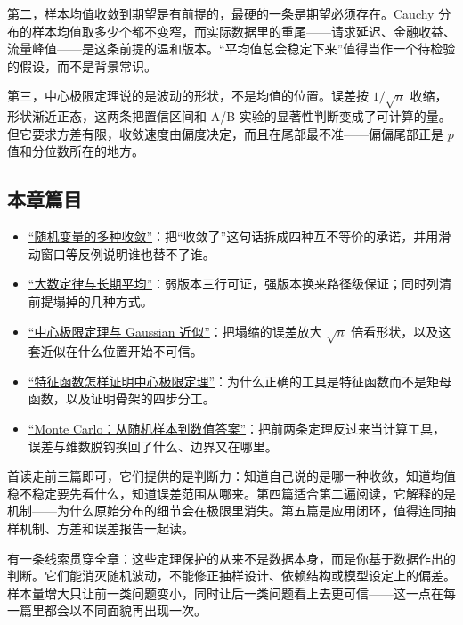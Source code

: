 第二，样本均值收敛到期望是有前提的，最硬的一条是期望必须存在。Cauchy 分布的样本均值取多少个都不变窄，而实际数据里的重尾——请求延迟、金融收益、流量峰值——是这条前提的温和版本。``平均值总会稳定下来''值得当作一个待检验的假设，而不是背景常识。

第三，中心极限定理说的是波动的形状，不是均值的位置。误差按 \(1/\sqrt n\) 收缩，形状渐近正态，这两条把置信区间和 A/B 实验的显著性判断变成了可计算的量。但它要求方差有限，收敛速度由偏度决定，而且在尾部最不准——偏偏尾部正是 \(p\) 值和分位数所在的地方。

\subsection{本章篇目}

\begin{itemize}
\tightlist
\item \hyperref[sec:05-Probability/08-Limit-Theorems/01]{``随机变量的多种收敛''}：把``收敛了''这句话拆成四种互不等价的承诺，并用滑动窗口等反例说明谁也替不了谁。
\item \hyperref[sec:05-Probability/08-Limit-Theorems/02]{``大数定律与长期平均''}：弱版本三行可证，强版本换来路径级保证；同时列清前提塌掉的几种方式。
\item \hyperref[sec:05-Probability/08-Limit-Theorems/03]{``中心极限定理与 Gaussian 近似''}：把塌缩的误差放大 \(\sqrt n\) 倍看形状，以及这套近似在什么位置开始不可信。
\item \hyperref[sec:05-Probability/08-Limit-Theorems/04]{``特征函数怎样证明中心极限定理''}：为什么正确的工具是特征函数而不是矩母函数，以及证明骨架的四步分工。
\item \hyperref[sec:05-Probability/08-Limit-Theorems/05]{``Monte Carlo：从随机样本到数值答案''}：把前两条定理反过来当计算工具，误差与维数脱钩换回了什么、边界又在哪里。
\end{itemize}

首读走前三篇即可，它们提供的是判断力：知道自己说的是哪一种收敛，知道均值稳不稳定要先看什么，知道误差范围从哪来。第四篇适合第二遍阅读，它解释的是机制——为什么原始分布的细节会在极限里消失。第五篇是应用闭环，值得连同抽样机制、方差和误差报告一起读。

有一条线索贯穿全章：这些定理保护的从来不是数据本身，而是你基于数据作出的判断。它们能消灭随机波动，不能修正抽样设计、依赖结构或模型设定上的偏差。样本量增大只让前一类问题变小，同时让后一类问题看上去更可信——这一点在每一篇里都会以不同面貌再出现一次。
